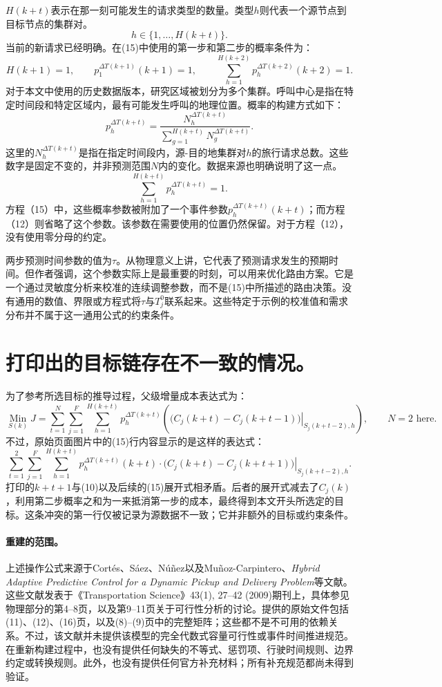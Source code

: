\documentclass[11pt]{article}
\begin{document}
$H(k+t)$表示在那一刻可能发生的请求类型的数量。类型$h$则代表一个源节点到目标节点的集群对。
\[
h\in\{1,\ldots,H(k+t)\}.
\]
当前的新请求已经明确。在(15)中使用的第一步和第二步的概率条件为：
\[
H(k+1)=1,\qquad p_1^{\Delta T(k+1)}(k+1)=1,
\qquad
\sum_{h=1}^{H(k+2)}p_h^{\Delta T(k+2)}(k+2)=1.
\]
对于本文中使用的历史数据版本，研究区域被划分为多个集群。呼叫中心是指在特定时间段和特定区域内，最有可能发生呼叫的地理位置。概率的构建方式如下：
\begin{equation}
p_h^{\Delta T(k+t)}
=\frac{N_h^{\Delta T(k+t)}}{\displaystyle\sum_{g=1}^{H(k+t)}N_g^{\Delta T(k+t)}}.
\tag{12}
\end{equation}
这里的$N_h^{\Delta T(k+t)}$是指在指定时间段内，源-目的地集群对$h$的旅行请求总数。这些数字是固定不变的，并非预测范围$N$内的变化。数据来源也明确说明了这一点。
\[
\sum_{h=1}^{H(k+t)}p_h^{\Delta T(k+t)}=1.
\]
方程（15）中，这些概率参数被附加了一个事件参数$p_h^{\Delta T(k+t)}(k+t)$；而方程（12）则省略了这个参数。该参数在需要使用的位置仍然保留。对于方程（12），没有使用零分母的约定。

两步预测时间参数的值为$\tau$。从物理意义上讲，它代表了预测请求发生的预期时间。但作者强调，这个参数实际上是最重要的时刻，可以用来优化路由方案。它是一个通过灵敏度分析来校准的连续调整参数，而不是(15)中所描述的路由决策。没有通用的数值、界限或方程式将$\tau$与$T_j^0$联系起来。这些特定于示例的校准值和需求分布并不属于这一通用公式的约束条件。

\section*{打印出的目标链存在不一致的情况。}
为了参考所选目标的推导过程，父级增量成本表达式为：
\begin{equation}
\operatorname*{Min}_{S(k)}J
=\sum_{t=1}^{N}\sum_{j=1}^{F}\sum_{h=1}^{H(k+t)}
p_h^{\Delta T(k+t)}
\left(\left.\bigl(C_j(k+t)-C_j(k+t-1)\bigr)
\right|_{S_j(k+t-2),h}\right),
\qquad N=2\text{ here}.
\tag{10}
\end{equation}
不过，原始页面图片中的(15)行内容显示的是这样的表达式：
\[
\sum_{t=1}^{2}\sum_{j=1}^{F}\sum_{h=1}^{H(k+t)}
p_h^{\Delta T(k+t)}(k+t)\cdot
\left.\bigl(C_j(k+t)-C_j(k+t+1)\bigr)
\right|_{S_j(k+t-2),h}.
\]
打印的$k+t+1$与(10)以及后续的(15)展开式相矛盾。后者的展开式减去了$C_j(k)$，利用第二步概率之和为一来抵消第一步的成本，最终得到本文开头所选定的目标。这条冲突的第一行仅被记录为源数据不一致；它并非额外的目标或约束条件。

\paragraph{重建的范围。}
上述操作公式来源于Cort\'es、S\'aez、N\'u\~nez以及Mu\~noz-Carpintero、\emph{Hybrid Adaptive Predictive Control for a Dynamic Pickup and Delivery Problem}等文献。这些文献发表于《Transportation Science》43(1), 27--42 (2009)期刊上，具体参见物理部分的第4--8页，以及第9--11页关于可行性分析的讨论。提供的原始文件包括(11)、(12)、(16)页，以及(8)--(9)页中的完整矩阵；这些都不是不可用的依赖关系。不过，该文献并未提供该模型的完全代数式容量可行性或事件时间推进规范。在重新构建过程中，也没有提供任何缺失的不等式、惩罚项、行驶时间规则、边界约定或转换规则。此外，也没有提供任何官方补充材料；所有补充规范都尚未得到验证。
\end{document}
